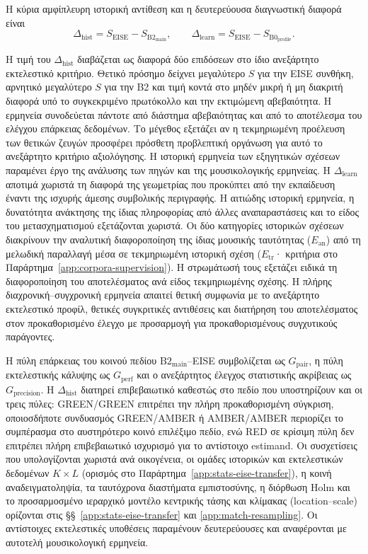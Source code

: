 \documentclass[11pt,a4paper]{article}
\begin{document}
Η κύρια αμφίπλευρη ιστορική αντίθεση και η δευτερεύουσα διαγνωστική διαφορά είναι
\[
\Delta_{\mathrm{hist}}=S_{\mathrm{EISE}}-S_{\mathrm{B2}_{\mathrm{main}}},
\qquad
\Delta_{\mathrm{learn}}=S_{\mathrm{EISE}}-S_{\mathrm{B0}_{\mathrm{profile}}}.
\]

Η τιμή του $\Delta_{\mathrm{hist}}$ διαβάζεται ως διαφορά δύο επιδόσεων στο ίδιο ανεξάρτητο εκτελεστικό κριτήριο. Θετικό πρόσημο δείχνει μεγαλύτερο $S$ για την EISE συνθήκη, αρνητικό μεγαλύτερο $S$ για την B2 και τιμή κοντά στο μηδέν μικρή ή μη διακριτή διαφορά υπό το συγκεκριμένο πρωτόκολλο και την εκτιμώμενη αβεβαιότητα. Η ερμηνεία συνοδεύεται πάντοτε από διάστημα αβεβαιότητας και από το αποτέλεσμα του ελέγχου επάρκειας δεδομένων. Το μέγεθος εξετάζει αν η τεκμηριωμένη προέλευση των θετικών ζευγών προσφέρει πρόσθετη προβλεπτική οργάνωση για αυτό το ανεξάρτητο κριτήριο αξιολόγησης. Η ιστορική ερμηνεία των εξηγητικών σχέσεων παραμένει έργο της ανάλυσης των πηγών και της μουσικολογικής ερμηνείας.
Η $\Delta_{\mathrm{learn}}$ αποτιμά χωριστά τη διαφορά της γεωμετρίας που προκύπτει από την εκπαίδευση έναντι της ισχυρής άμεσης συμβολικής περιγραφής. Η αιτιώδης ιστορική ερμηνεία, η δυνατότητα ανάκτησης της ίδιας πληροφορίας από άλλες αναπαραστάσεις και το είδος του μετασχηματισμού εξετάζονται χωριστά. Οι δύο κατηγορίες ιστορικών σχέσεων διακρίνουν την αναλυτική διαφοροποίηση της ίδιας μουσικής ταυτότητας ($E_{\mathrm{an}}$) από τη μελωδική παραλλαγή μέσα σε τεκμηριωμένη ιστορική σχέση ($E_{\mathrm{tr}}$· κριτήρια στο Παράρτημα~\ref{app:corpora-supervision}). Η στρωμάτωσή τους εξετάζει ειδικά τη διαφοροποίηση του αποτελέσματος ανά είδος τεκμηριωμένης σχέσης. Η πλήρης διαχρονική--συγχρονική ερμηνεία απαιτεί θετική συμφωνία με το ανεξάρτητο εκτελεστικό προφίλ, θετικές συγκριτικές αντιθέσεις και διατήρηση του αποτελέσματος στον προκαθορισμένο έλεγχο με προσαρμογή για προκαθορισμένους συγχυτικούς παράγοντες.

Η πύλη επάρκειας του κοινού πεδίου $\mathrm{B2}_{\mathrm{main}}$--EISE συμβολίζεται ως $G_{\mathrm{pair}}$, η πύλη εκτελεστικής κάλυψης ως $G_{\mathrm{perf}}$ και ο ανεξάρτητος έλεγχος στατιστικής ακρίβειας ως $G_{\mathrm{precision}}$. Η $\Delta_{\mathrm{hist}}$ διατηρεί επιβεβαιωτικό καθεστώς στο πεδίο που υποστηρίζουν και οι τρεις πύλες: GREEN/GREEN επιτρέπει την πλήρη προκαθορισμένη σύγκριση, οποιοσδήποτε συνδυασμός GREEN/AMBER ή AMBER/AMBER περιορίζει το συμπέρασμα στο αυστηρότερο κοινό επιλέξιμο πεδίο, ενώ RED σε κρίσιμη πύλη δεν επιτρέπει πλήρη επιβεβαιωτικό ισχυρισμό για το αντίστοιχο estimand. Οι συσχετίσεις που υπολογίζονται χωριστά ανά οικογένεια, οι ομάδες ιστορικών και εκτελεστικών δεδομένων $K\times L$ (ορισμός στο Παράρτημα~\ref{app:stats-eise-transfer}), η κοινή αναδειγματοληψία, τα ταυτόχρονα διαστήματα εμπιστοσύνης, η διόρθωση Holm και το προσαρμοσμένο ιεραρχικό μοντέλο κεντρικής τάσης και κλίμακας (location--scale) ορίζονται στις §§~\ref{app:stats-eise-transfer} και \ref{app:match-resampling}. Οι αντίστοιχες εκτελεστικές υποθέσεις παραμένουν δευτερεύουσες και αναφέρονται με αυτοτελή μουσικολογική ερμηνεία.
\end{document}
